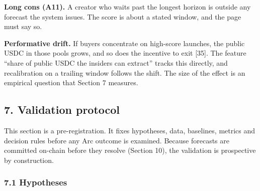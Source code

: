 \textbf{Long cons (A11).} A creator who waits past the longest horizon is outside any forecast the system issues. The score is about a stated window, and the page must say so.

\textbf{Performative drift.} If buyers concentrate on high-score launches, the public USDC in those pools grows, and so does the incentive to exit {[}35{]}. The feature ``share of public USDC the insiders can extract'' tracks this directly, and recalibration on a trailing window follows the shift. The size of the effect is an empirical question that Section 7 measures.

\subsection{7. Validation protocol}\label{validation-protocol}

This section is a pre-registration. It fixes hypotheses, data, baselines, metrics and decision rules before any Arc outcome is examined. Because forecasts are committed on-chain before they resolve (Section 10), the validation is prospective by construction.

\subsubsection{7.1 Hypotheses}\label{hypotheses}

